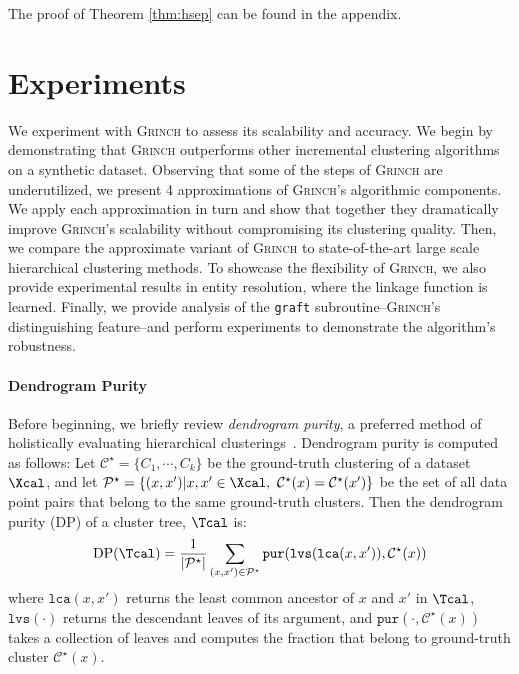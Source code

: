 \documentclass{article} \usepackage[utf8]{inputenc} \usepackage[T1]{fontenc}    \usepackage{hyperref}       \usepackage{url}            \usepackage{booktabs}       \usepackage{amsfonts}       \usepackage{nicefrac}       \usepackage{microtype}      \usepackage{geometry}
\newcommand{\alg}{\textsc{Grinch}\xspace}
\newcommand{\record}{data point\xspace}
\newcommand{\cstar}{\ensuremath{\mathcal{C}^\star}}
\newcommand{\graft}{\texttt{graft}\xspace}
\newcommand{\lvs}[1]{\ensuremath{\texttt{lvs}(#1)}}
\newcommand{\lca}[2]{\ensuremath{\texttt{lca}(#1, #2)}}
\newcommand{\pur}[1]{\ensuremath{\texttt{pur}}(#1)\xspace}
\begin{document}
The proof of Theorem \ref{thm:hsep} can be found in the appendix. \section{Experiments}
\label{sec:exp}
We experiment with \alg to assess its scalability and accuracy. We
begin by demonstrating that \alg outperforms other incremental
clustering algorithms on a synthetic dataset. Observing that some of
the steps of \alg are underutilized, we present 4 approximations of
\alg's algorithmic components. We apply each approximation in turn and
show that together they dramatically improve \alg's scalability
without compromising its clustering quality. Then, we compare the
approximate variant of \alg to state-of-the-art large scale
hierarchical clustering methods. To showcase the flexibility of \alg,
we also provide experimental results in entity resolution, where the
linkage function is learned.  Finally, we provide analysis of the
\graft subroutine--\alg's distinguishing feature--and perform
experiments to demonstrate the algorithm's robustness.

\paragraph{Dendrogram Purity}
Before beginning, we briefly review \emph{dendrogram purity}, a
preferred method of holistically evaluating hierarchical
clusterings~\cite{blundell2011discovering, heller2005bayesian,
  kobren2017hierarchical}. Dendrogram purity is computed as follows:
Let $\cstar = \{C_1, \cdots, C_k\}$ be the ground-truth clustering of
a dataset $\Xcal$, and let
$\mathcal{P}^\star = \{(x,x') | x,x' \in \Xcal,\ \cstar(x) =
\cstar(x') \}$ be the set of all \record pairs that belong to the same
ground-truth clusters.  Then the dendrogram purity (DP) of a cluster
tree, $\Tcal$ is:
\begin{align*}
\textrm{DP}(\Tcal) = \frac{1}{|\mathcal{P}^\star|} \sum_{(x,x') \in
\mathcal{P}^\star} \pur{\lvs{\lca{x}{x'}}, \cstar(x)}
\end{align*}
where \lca{x}{x'} returns the least common ancestor of $x$ and $x'$ in
$\Tcal$, \lvs{\cdot} returns the descendant leaves of its argument,
and $\pur{\cdot, \cstar(x)}$ takes a collection of leaves and computes
the fraction that belong to ground-truth cluster $\cstar(x)$.
\end{document}
